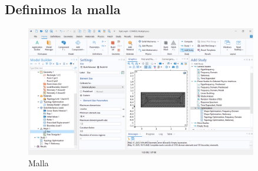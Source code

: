 \documentclass{article}
\theoremstyle{mytheoremstyle}
\theoremstyle{mytheoremstyle}
\theoremstyle{myproblemstyle}
\begin{document}
\subsection{Definimos la malla}
             \begin{figure}[H]
              \centering
              \includegraphics[width=0.9\textwidth]{malla.png}
              \caption{Malla}
              \label{fig:imagen_x}
            \end{figure}
\end{document}
